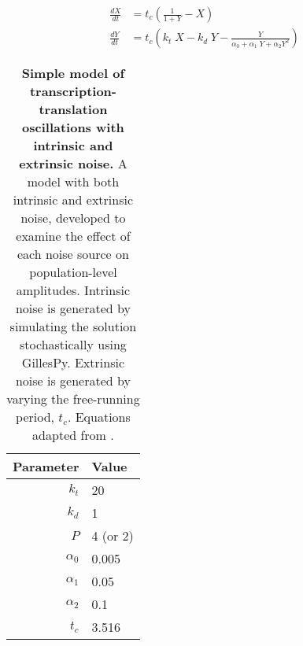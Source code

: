 \documentclass[11pt, letterpaper]{article}
\begin{document}
\begin{table}
  \caption{{\bfseries Simple model of transcription-translation oscillations with intrinsic and extrinsic noise.} A model with both intrinsic and extrinsic noise, developed to examine the effect of each noise source on population-level amplitudes. Intrinsic noise is generated by simulating the solution stochastically using GillesPy. Extrinsic noise is generated by varying the free-running period, $t_c$. Equations adapted from \cite{Novak2008}.}
  \centering
  \begin{align*}
    \frac{dX}{dt} &= t_c \left(\frac{1}{1 + Y} - X\right) \\
    \frac{dY}{dt} &= t_c \left(k_t \; X - k_d \; Y - \frac{Y}{\alpha_0 + \alpha_1 \; Y + \alpha_2 Y^2}\right)
  \end{align*}

  \begin{tabular}{rl}
    \toprule Parameter & Value \\\midrule
    $k_t$ & 20 \\
    $k_d$ & 1  \\
    $P$   & 4 (or 2)  \\
    $\alpha_0$ & 0.005 \\
    $\alpha_1$ & 0.05  \\
    $\alpha_2$ & 0.1   \\
    $t_c$ & 3.516 \\\bottomrule
    \end{tabular}
  \label{tab:novak}
\end{table}
\end{document}
